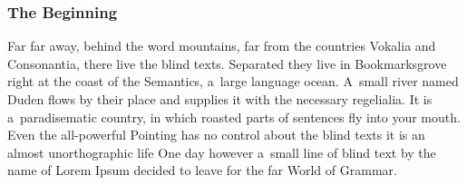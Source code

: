 \documentclass[12pt, a4paper, oneside]{article}
\theoremstyle{Plain}
\theoremstyle{Definition}
\theoremstyle{Remark}
\begin{document}
\subsubsection{The Beginning}
\label{sec:tests:lorem-ipsum:beginning}
Far far away, behind the word mountains, far from the countries Vokalia and Consonantia, there live the blind texts. Separated they live in Bookmarksgrove right at the coast of the Semantics, a~large language ocean. A~small river named Duden flows by their place and supplies it with the necessary regelialia. It is a~paradisematic country, in which roasted parts of sentences fly into your mouth. Even the all-powerful Pointing has no control about the blind texts it is an almost unorthographic life One day however a~small line of blind text by the name of Lorem Ipsum decided to leave for the far World of Grammar.
\end{document}
